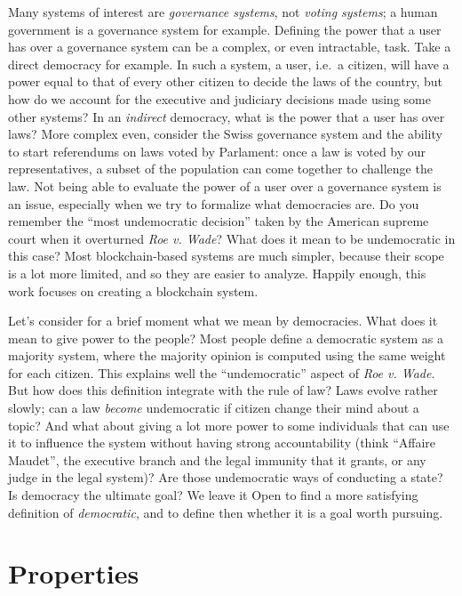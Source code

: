Many systems of interest are \emph{governance systems}, not \emph{voting systems}; a human government is a governance system for example.
Defining the power that a user has over a governance system can be a complex, or even intractable, task.
Take a direct democracy for example.
In such a system, a user, i.e.\ a citizen, will have a power equal to that of every other citizen to decide the laws of the country, but how do we account for the executive and judiciary decisions made using some other systems?
In an \emph{indirect} democracy, what is the power that a user has over laws?
More complex even, consider the Swiss governance system and the ability to start referendums on laws voted by Parlament: once a law is voted by our representatives, a subset of the population can come together to challenge the law.
Not being able to evaluate the power of a user over a governance system is an issue, especially when we try to formalize what democracies are.
Do you remember the \enquote{most undemocratic decision} taken by the American supreme court when it overturned \textit{Roe v. Wade}?
What does it mean to be undemocratic in this case?
Most blockchain-based systems are much simpler, because their scope is a lot more limited, and so they are easier to analyze.
Happily enough, this work focuses on creating a blockchain system.

Let's consider for a brief moment what we mean by democracies.
What does it mean to give power to the people?
Most people define a democratic system as a majority system, where the majority opinion is computed using the same weight for each citizen.
This explains well the \enquote{undemocratic} aspect of \textit{Roe v. Wade}.
But how does this definition integrate with the rule of law?
Laws evolve rather slowly; can a law \emph{become} undemocratic if citizen change their mind about a topic?
And what about giving a lot more power to some individuals that can use it to influence the system without having strong accountability (think \enquote{Affaire Maudet}, the executive branch and the legal immunity that it grants, or any judge in the legal system)?
Are those undemocratic ways of conducting a state?
Is democracy the ultimate goal?
We leave it Open to find a more satisfying definition of \emph{democratic}, and to define then whether it is a goal worth pursuing.

\section{Properties}

